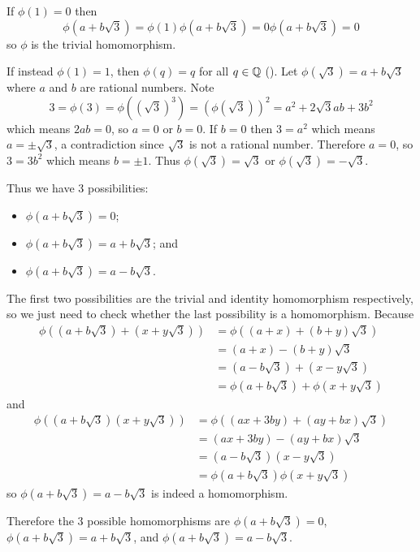 \begin{questions}
    If $\phi(1) = 0$ then
    \[
        \phi(a+b\sqrt3) = \phi(1)\phi(a+b\sqrt3) = 0\phi(a+b\sqrt3) = 0
    \]
    so $\phi$ is the trivial homomorphism.

    If instead $\phi(1) = 1$, then $\phi(q) = q$ for all $q \in \mathbb{Q}$ (). Let $\phi(\sqrt3) = a+b\sqrt3$ where $a$ and $b$ are rational numbers. Note
    \[
        3 = \phi(3) = \phi((\sqrt3)^3) = \left(\phi(\sqrt3)\right)^2 = a^2+2\sqrt3ab+3b^2
    \]
    which means $2ab = 0$, so $a = 0$ or $b = 0$. If $b = 0$ then $3 = a^2$ which means $a = \pm\sqrt3$, a contradiction since $\sqrt3$ is not a rational number. Therefore $a = 0$, so $3 = 3b^2$ which means $b = \pm1$. Thus $\phi(\sqrt3) = \sqrt3$ or $\phi(\sqrt3) = -\sqrt3$.

    Thus we have 3 possibilities:
    \begin{itemize}
        \item $\phi(a+b\sqrt3) = 0$;
        \item $\phi(a+b\sqrt3) = a+b\sqrt3$; and
        \item $\phi(a+b\sqrt3) = a-b\sqrt3$.
    \end{itemize}
    The first two possibilities are the trivial and identity homomorphism respectively, so we just need to check whether the last possibility is a homomorphism. Because
    \begin{align*}
        \phi((a+b\sqrt3) + (x+y\sqrt3)) &= \phi((a+x)+(b+y)\sqrt3)\\
        &= (a+x)-(b+y)\sqrt3\\
        &= (a-b\sqrt3) + (x-y\sqrt3)\\
        &= \phi(a+b\sqrt3) + \phi(x+y\sqrt3)
    \end{align*}
    and
    \begin{align*}
        \phi((a+b\sqrt3)(x+y\sqrt3)) &= \phi((ax+3by)+(ay+bx)\sqrt3)\\
        &= (ax+3by)-(ay+bx)\sqrt3\\
        &= (a-b\sqrt3)(x-y\sqrt3)\\
        &= \phi(a+b\sqrt3)\phi(x+y\sqrt3)
    \end{align*}
    so $\phi(a+b\sqrt3) = a-b\sqrt3$ is indeed a homomorphism.

    Therefore the 3 possible homomorphisms are $\phi(a+b\sqrt3) = 0$, $\phi(a+b\sqrt3) = a+b\sqrt3$, and $\phi(a+b\sqrt3) = a-b\sqrt3$.


\end{questions}
